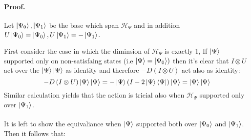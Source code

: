 \documentclass{article}
\begin{document}
\begin{multicols*}{2}
\paragraph{Proof.} Let $\ket{\Psi_0}, \ket{\Psi_1}$ be the base which span $ \mathcal{H}_{\Psi}$ and in addition $U\ket{\Psi_0} = \ket{\Psi_0}, U\ket{\Psi_1} =- \ket{\Psi_1}$.

First consider the case in which the diminsion of $ \mathcal{H}_{\Psi}$ is exactly 1, If $ \ket{\Psi} $ supported only on non-satisfaing states (i.e $\ket{\Psi} = \ket{\Psi_{0}}) $ then it's clear that $ I \otimes U $ act over the $ \ket{\Psi}\ket{\Psi} $ as identity and therefore $ -D\left( I \otimes U \right) $ act also as identity: 
\begin{equation*}
  -D\left( I \otimes U \right) \ket{\Psi}\ket{\Psi} = -\ket{\Psi}\left( I - 2\ket{\Psi}\bra{\Psi}  \right) \ket{\Psi} = \ket{\Psi}\ket{\Psi}
\end{equation*}
Similar calculation yields that the action is tricial also when  $ \mathcal{H}_{\Psi}$  supported only over $ \ket{\Psi_1} $.  

\paragraph{}

It is left to show the equivaliance when $\ket{\Psi}$ supported both over $\ket{\Psi_0}$ and $\ket{\Psi_1}$. Then it follows that:


\end{multicols*}
\end{document}
